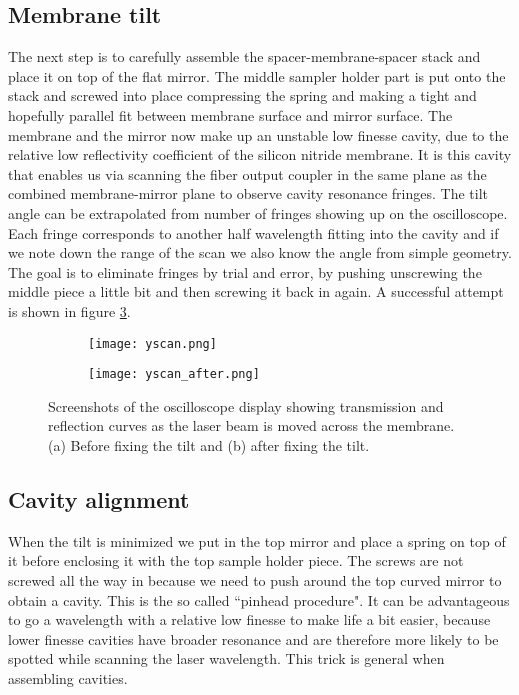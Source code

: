 \subsection{Membrane tilt}
The next step is to carefully assemble the spacer-membrane-spacer stack and place it on top of the flat mirror. The middle sampler holder part is put onto the stack and screwed into place compressing the spring and making a tight and hopefully parallel fit between membrane surface and mirror surface. The membrane and the mirror now make up an unstable low finesse cavity, due to the relative low reflectivity coefficient of the silicon nitride membrane. It is this cavity that enables us via scanning the fiber output coupler in the same plane as the combined membrane-mirror plane to observe cavity resonance fringes. The tilt angle can be extrapolated from number of fringes showing up on the oscilloscope. Each fringe corresponds to another half wavelength fitting into the cavity and if we note down the range of the scan we also know the angle from simple geometry. The goal is to eliminate fringes by trial and error, by pushing unscrewing the middle piece a little bit and then screwing it back in again. A successful attempt is shown in figure \ref{fig:mem_tilt}.

\begin{figure}[H]
\centering
    \begin{subfigure}[b]{0.49\textwidth}
    \centering
    \texttt{[image: yscan.png]}
    \caption{}
    \label{fig:yscan}
    \end{subfigure}
    \hfil
    \begin{subfigure}[b]{0.49\textwidth}
    \centering
    \texttt{[image: yscan\_after.png]}
    \caption{}
    \label{fig:yscan_after}
    \end{subfigure}
\caption{Screenshots of the oscilloscope display showing transmission and reflection curves as the laser beam is moved across the membrane. (a) Before fixing the tilt and (b) after fixing the tilt.}
\label{fig:mem_tilt}
\end{figure}

\subsection{Cavity alignment}
When the tilt is minimized we put in the top mirror and place a spring on top of it before enclosing it with the top sample holder piece. The screws are not screwed all the way in because we need to push around the top curved mirror to obtain a cavity. This is the so called ``pinhead procedure". It can be advantageous to go a wavelength with a relative low finesse to make life a bit easier, because lower finesse cavities have broader resonance and are therefore more likely to be spotted while scanning the laser wavelength. This trick is general when assembling cavities.

